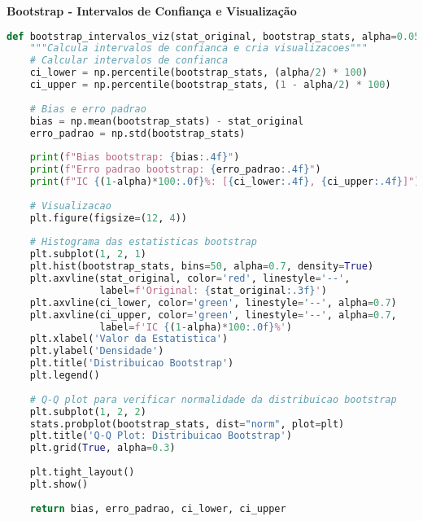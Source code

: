 \begin{researchbox}
\textbf{Bootstrap - Intervalos de Confiança e Visualização}

\begin{lstlisting}[language=Python]
def bootstrap_intervalos_viz(stat_original, bootstrap_stats, alpha=0.05):
    """Calcula intervalos de confianca e cria visualizacoes"""
    # Calcular intervalos de confianca
    ci_lower = np.percentile(bootstrap_stats, (alpha/2) * 100)
    ci_upper = np.percentile(bootstrap_stats, (1 - alpha/2) * 100)
    
    # Bias e erro padrao
    bias = np.mean(bootstrap_stats) - stat_original
    erro_padrao = np.std(bootstrap_stats)
    
    print(f"Bias bootstrap: {bias:.4f}")
    print(f"Erro padrao bootstrap: {erro_padrao:.4f}")
    print(f"IC {(1-alpha)*100:.0f}%: [{ci_lower:.4f}, {ci_upper:.4f}]")
    
    # Visualizacao
    plt.figure(figsize=(12, 4))
    
    # Histograma das estatisticas bootstrap
    plt.subplot(1, 2, 1)
    plt.hist(bootstrap_stats, bins=50, alpha=0.7, density=True)
    plt.axvline(stat_original, color='red', linestyle='--', 
                label=f'Original: {stat_original:.3f}')
    plt.axvline(ci_lower, color='green', linestyle='--', alpha=0.7)
    plt.axvline(ci_upper, color='green', linestyle='--', alpha=0.7, 
                label=f'IC {(1-alpha)*100:.0f}%')
    plt.xlabel('Valor da Estatistica')
    plt.ylabel('Densidade')
    plt.title('Distribuicao Bootstrap')
    plt.legend()
    
    # Q-Q plot para verificar normalidade da distribuicao bootstrap
    plt.subplot(1, 2, 2)
    stats.probplot(bootstrap_stats, dist="norm", plot=plt)
    plt.title('Q-Q Plot: Distribuicao Bootstrap')
    plt.grid(True, alpha=0.3)
    
    plt.tight_layout()
    plt.show()
    
    return bias, erro_padrao, ci_lower, ci_upper
\end{lstlisting}
\end{researchbox}

